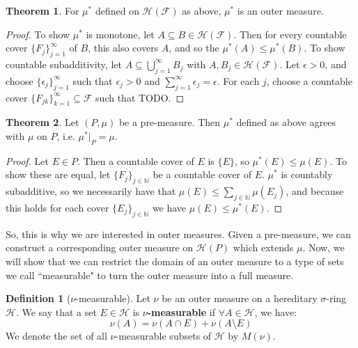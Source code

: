 \documentclass[11pt, oneside]{amsart}   	%
\theoremstyle{definition}
\newtheorem{definition}{Definition}[section]
\newtheorem{theorem}{Theorem}[section]
\begin{document}
	\begin{theorem}
		For $\mu^*$ defined on $\mathcal H(\mathcal F)$ as above, $\mu^*$ is an outer measure.
	\end{theorem}
	
	\begin{proof}
		To show $\mu^*$ is monotone, let $A\subseteq B\in\mathcal H(\mathcal F)$. Then for every countable cover 
		$\{F_j\}_{j = 1}^\infty$ of $B$, this also covers $A$, and so the $\mu^*(A)\leq\mu^*(B)$. To show countable 
		subadditivity, let $A\subseteq\bigcup_{j = 1}^\infty B_j$ with $A, B_j\in\mathcal H(\mathcal F)$. Let $\epsilon > 0$, 
		and choose $\{\epsilon_j\}_{j = 1}^\infty$ such that $\epsilon_j > 0$ and $\sum_{j = 1}^\infty\epsilon_j = \epsilon$. For 
		each $j$, choose a countable cover $\{F_{jk}\}_{k = 1}^\infty\subseteq\mathcal F$ such that TODO.
	\end{proof}
	
	\begin{theorem}
		Let $(P, \mu)$ be a pre-measure. Then $\mu^*$ defined as above agrees with $\mu$ on $P$, i.e. $\mu^*|_P =\mu$.
	\end{theorem}
	
	\begin{proof}
		Let $E\in P$. Then a countable cover of $E$ is $\{E\}$, so $\mu^*(E)\leq\mu(E)$. To show these are equal, let 
		$\{F_j\}_{j\in\mathbb N}$ be a countable cover of $E$. $\mu^*$ is countably subadditive, so we necessarily have that 
		$\mu(E)\leq\sum_{j\in\mathbb N}\mu(E_j)$, and because this holds for each cover $\{E_j\}_{j\in\mathbb N}$ we have 
		$\mu(E)\leq\mu^*(E)$. 
	\end{proof}
	
	So, this is why we are interested in outer measures. Given a pre-measure, we can construct a corresponding outer 
	measure on $\mathcal H(P)$ which extends $\mu$. Now, we will show that we can restrict the domain of an outer 
	measure to a type of sets we call ``measurable" to turn the outer measure into a full measure.
	
	\begin{definition}[$\nu$-measurable]
		Let $\nu$ be an outer measure on a hereditary $\sigma$-ring $\mathcal H$. We say that a set $E\in\mathcal H$ is 
		\textbf{$\nu$-measurable} if $\forall A\in\mathcal H$, we have:
		$$
			\nu(A) = \nu(A\cap E) + \nu(A\setminus E)
		$$
		We denote the set of all $\nu$-measurable subsets of $\mathcal H$ by $M(\nu)$.
	\end{definition}
	
\end{document}
